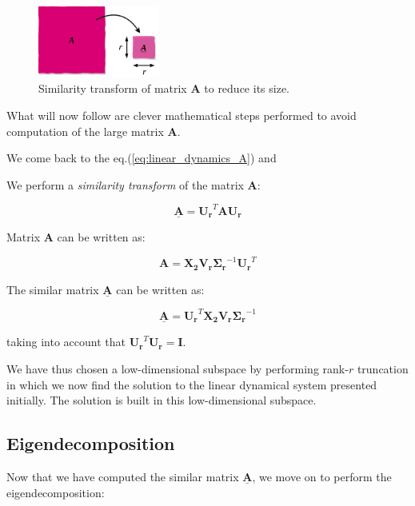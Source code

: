 \documentclass[10pt,twocolumn]{article}
\begin{document}
\begin{figure}
\centering\includegraphics[width=4cm]{similar-matrices.png}
\caption{Similarity transform of matrix $\mathbf{A}$ to reduce its size.}
\label{fig:similar-matrices}
\end{figure}

What will now follow are clever mathematical steps performed to avoid computation of the large matrix $\mathbf{A}$.

We come back to the eq.(\ref{eq:linear_dynamics_A}) and

We perform a \textit{similarity transform} of the matrix $\mathbf{A}$:

\begin{equation} \label{eq:similarity-transform}
\underline{\mathbf{A}} = \mathbf{U_r}^T \mathbf{A} \mathbf{U_r}
\end{equation}

Matrix $\mathbf{A}$ can be written as:

\begin{equation} \label{eq:A}
\mathbf{A} = \mathbf{X_2} \mathbf{V_r} \mathbf{\Sigma_r}^{-1} \mathbf{U_r}^T
\end{equation}

The similar matrix $\underline{\mathbf{A}}$ can be written as:

\begin{equation} \label{eq:A_underline}
\underline{\mathbf{A}} = \mathbf{U_r}^T \mathbf{X_2} \mathbf{V_r} \mathbf{\Sigma_r}^{-1} 
\end{equation}

taking into account that $\mathbf{U_r}^T \mathbf{U_r} = \mathbf{I}$.

We have thus chosen a low-dimensional subspace by performing rank-$r$ truncation in which we now find the solution to the linear dynamical system presented initially. The solution is built in this low-dimensional subspace.

\subsection{Eigendecomposition}

Now that we have computed the similar matrix $\underline{\mathbf{A}}$, we move on to perform the eigendecomposition:
\end{document}
